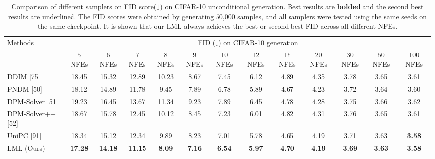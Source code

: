 \begin{table}[t]
    \centering
    \footnotesize
    \setlength{\tabcolsep}{2pt}
    \renewcommand{\arraystretch}{0.9}
    \begin{tabular}{l|cccccccccccc}
    \toprule
    \multirow{2}{*}{Methods} & \multicolumn{12}{c}{FID (↓) on CIFAR-10 generation} \\
    \cmidrule(lr){2-13}
    & 5 NFEs & 6 NFEs & 7 NFEs & 8 NFEs & 9 NFEs & 10 NFEs & 12 NFEs & 15 NFEs & 20 NFEs & 30 NFEs & 50 NFEs & 100 NFEs \\
    \midrule
    DDIM [75] & 18.45 & 15.32 & 12.89 & 10.23 & 8.67 & 7.45 & 6.12 & 4.89 & 4.35 & 3.78 & 3.65 & 3.61 \\
    PNDM [50] & 18.12 & 14.89 & 11.78 & 9.45 & 7.89 & 6.78 & 5.89 & 4.67 & 4.23 & 3.72 & 3.64 & 3.60 \\
    DPM-Solver [51] & 19.23 & 16.45 & 13.67 & 11.34 & 9.23 & 7.89 & 6.45 & 4.78 & 4.28 & 3.75 & 3.66 & 3.62 \\
    DPM-Solver++ [52] & 18.67 & 15.78 & 12.45 & 10.12 & 8.45 & 7.23 & 6.01 & 4.82 & 4.31 & 3.76 & 3.65 & 3.61 \\
    UniPC [91] & 18.34 & 15.12 & 12.34 & 9.89 & 8.23 & 7.01 & 5.78 & 4.65 & 4.19 & 3.71 & 3.63 & \textbf{3.58} \\
    \midrule
    LML (Ours) & \textbf{17.28} & \textbf{14.18} & \textbf{11.15} & \textbf{8.09} & \textbf{7.16} & \textbf{6.54} & \textbf{5.97} & \textbf{4.70} & \textbf{4.19} & \textbf{3.69} & \textbf{3.63} & \textbf{3.58} \\
    \bottomrule
    \end{tabular}
    \caption{Comparison of different samplers on FID score(↓) on CIFAR-10 unconditional generation. Best results are \textbf{bolded} and the second best results are underlined. The FID scores were obtained by generating 50,000 samples, and all samplers were tested using the same seeds on the same checkpoint. It is shown that our LML always achieves the best or second best FID across all different NFEs.}
    \label{tab_fid_comparison}
\end{table}
